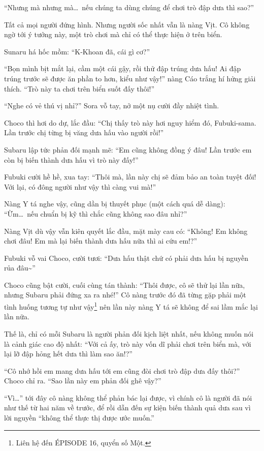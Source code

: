 \documentclass[../main.tex]{subfiles}
\begin{document}
``Nhưng mà nhưng mà\dots\ nếu chúng ta dùng chúng để chơi trò đập dưa thì sao?''

Tất cả mọi người đứng hình. Nhưng người sốc nhất vẫn là nàng Vịt. Cô không ngờ tới ý tưởng này, một trò chơi mà chỉ có thể thực hiện ở trên biển.

Sunaru há hốc mồm: ``K-Khoan đã, cái gì cơ?''

``Bọn mình bịt mắt lại, cầm một cái gậy, rồi thử đập trúng dưa hấu! Ai đập trúng trước sẽ được ăn phần to hơn, kiểu như vậy!'' nàng Cáo trắng hí hửng giải thích. ``Trò này ta chơi trên biển suốt đấy thôi!''

``Nghe có vẻ thú vị nhỉ?'' Sora vỗ tay, nở một nụ cười đầy nhiệt tình.

Choco thì hơi do dự, lắc đầu: ``Chị thấy trò này hơi nguy hiểm đó, Fubuki-sama. Lần trước chị từng bị văng dưa hấu vào người rồi!''

Subaru lập tức phản đối mạnh mẽ: ``Em cũng không đồng ý đâu! Lần trước em còn bị biến thành dưa hấu vì trò này đấy!''

Fubuki cười hề hề, xua tay: ``Thôi mà, lần này chị sẽ đảm bảo an toàn tuyệt đối! Với lại, có đông người như vậy thì càng vui mà!''

Nàng Y tá nghe vậy, cũng dần bị thuyết phục (một cách quá dễ dàng): ``Ừm\dots\ nếu chuẩn bị kỹ thì chắc cũng không sao đâu nhỉ?''

Nàng Vịt dù vậy vẫn kiên quyết lắc đầu, mặt mày cau có: ``Không! Em không chơi đâu! Em mà lại biến thành dưa hấu nữa thì ai cứu em!?''

Fubuki vỗ vai Choco, cười tươi: ``Dưa hấu thật chứ có phải dưa hấu bị nguyền rủa đâu\~{}''

Choco cũng bật cười, cuối cùng tán thành: ``Thôi được, cô sẽ thử lại lần nữa, nhưng Subaru phải đứng xa ra nhé!'' Cô nàng trước đó đã từng gặp phải một tình huống tương tự như vậy\footnote{Liên hệ đến {\flaregothic ÉPISODE 16}, quyển số Một.} nên lần này nàng Y tá sẽ không để sai lầm mắc lại lần nữa.

Thế là, chỉ có mỗi Subaru là người phản đối kịch liệt nhất, nếu không muốn nói là cảnh giác cao độ nhất: ``Với cả ấy, trò này vốn dĩ phải chơi trên biển mà, với lại lỡ đập hỏng hết dưa thì làm sao ăn!?''

``Cô nhớ hồi em mang dưa hấu tới em cũng đòi chơi trò đập dưa đấy thôi?'' Choco chỉ ra. ``Sao lần này em phản đối ghê vậy?''

``Vì\dots'' tới đây cô nàng không thể phản bác lại được, vì chính cô là người đã nói như thế từ hai năm về trước, để rồi dẫn đến sự kiện biến thành quả dưa sau vì lời nguyền ``không thể thực thị được ước muốn.''
\end{document}
